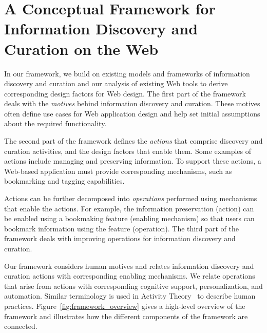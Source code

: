\documentclass{sigchi}
\begin{document}
{\section{A Conceptual Framework for Information Discovery and Curation on the Web}
\label{sec:framework}

In our framework, we build on existing models and frameworks of information discovery and curation and our analysis of existing Web tools to derive corresponding design factors for Web design. The first part of the framework deals with the \textit{motives} behind information discovery and curation. These motives often define use cases for Web application design and help set initial assumptions about the required functionality.

The second part of the framework defines the \textit{actions} that comprise discovery and curation activities, and the design factors that enable them. Some examples of actions include managing and preserving information. To support these actions, a Web-based application must provide corresponding mechanisms, such as bookmarking and tagging capabilities.

Actions can be further decomposed into \textit{operations} performed using mechanisms that enable the actions. For example, the information preservation (action) can be enabled using a bookmaking feature (enabling mechanism) so that users can bookmark information using the feature (operation). The third part of the framework deals with improving operations for information discovery and curation.  

Our framework considers human motives and relates information discovery and curation actions with corresponding enabling mechanisms. We relate operations that arise from actions with corresponding cognitive support, personalization, and automation.  Similar terminology is used in Activity Theory~\cite{kuutti1996activity} to describe human practices. Figure~\ref{fig:framework_overview} gives a high-level overview of the framework and illustrates how the different components of the framework are connected.



}
\end{document}

